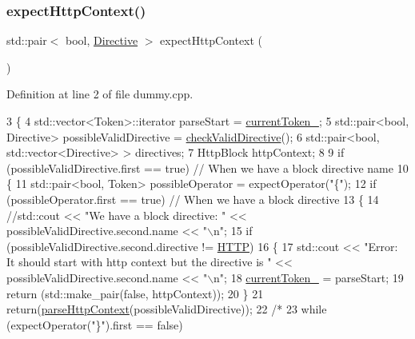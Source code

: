 \subsubsection{\texorpdfstring{expect\+Http\+Context()}{expectHttpContext()}}
{\footnotesize\ttfamily std\+::pair$<$ bool, \hyperlink{classft_1_1_directive}{Directive} $>$ expect\+Http\+Context (\begin{DoxyParamCaption}{ }\end{DoxyParamCaption})}



Definition at line 2 of file dummy.\+cpp.


\begin{DoxyCode}
3     \{
4         std::vector<Token>::iterator parseStart = \hyperlink{classft_1_1_parser_a942c5b794d108f144c5b5028aaa34cb6}{currentToken\_};
5         std::pair<bool, Directive> possibleValidDirective = \hyperlink{classft_1_1_parser_ad48298d21629daf7c9a31e101bf322ba}{checkValidDirective}();
6         std::pair<bool, std::vector<Directive> > directives;
7         HttpBlock   httpContext;
8 
9         \textcolor{keywordflow}{if} (possibleValidDirective.first == \textcolor{keyword}{true}) \textcolor{comment}{// When we have a block directive name}
10         \{
11             std::pair<bool, Token> possibleOperator = expectOperator(\textcolor{stringliteral}{"\{"});
12             \textcolor{keywordflow}{if} (possibleOperator.first == \textcolor{keyword}{true}) \textcolor{comment}{// When we have a block directive}
13             \{
14                 \textcolor{comment}{//std::cout << "We have a block directive: " << possibleValidDirective.second.name << "\(\backslash\)n";}
15                 \textcolor{keywordflow}{if} (possibleValidDirective.second.directive != \hyperlink{namespaceft_a5a5554dff10f0dc50bae4cc5825ad75da67e044074f46e6cea22788527da5f02e}{HTTP})
16                 \{
17                     std::cout << \textcolor{stringliteral}{"Error: It should start with http context but the directive is "} << 
      possibleValidDirective.second.name << \textcolor{stringliteral}{"\(\backslash\)n"};
18                     \hyperlink{classft_1_1_parser_a942c5b794d108f144c5b5028aaa34cb6}{currentToken\_} = parseStart;
19                     \textcolor{keywordflow}{return} (std::make\_pair(\textcolor{keyword}{false}, httpContext));
20                 \}
21                 \textcolor{keywordflow}{return}(\hyperlink{classft_1_1_parser_a17a213759b2cca8e91ca225b2e86739d}{parseHttpContext}(possibleValidDirective));
22 \textcolor{comment}{/*}
23 \textcolor{comment}{                while (expectOperator("\}").first == false)}

\end{DoxyCode}
